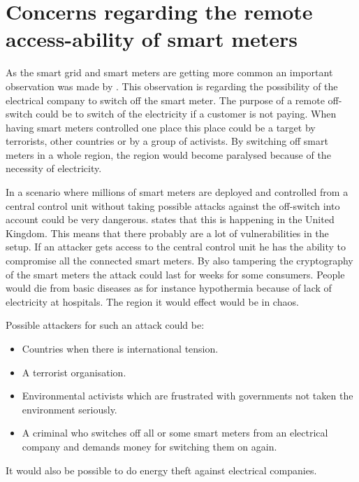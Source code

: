 \section{Concerns regarding the remote access-ability of smart meters}\label{off_switch}
As the smart grid and smart meters are getting more common an important observation was made by \citet{offswitch}.
This observation is regarding the possibility of the electrical company to switch off the smart meter.
The purpose of a remote off-switch could be to switch of the electricity if a customer is not paying.
When having smart meters controlled one place this place could be a target by terrorists, other countries or by a group of activists. 
By switching off smart meters in a whole region, the region would become paralysed because of the necessity of electricity.


In a scenario where millions of smart meters are deployed and controlled from a central control unit without taking possible attacks against the off-switch into account could be very dangerous.
\citet{offswitch} states that this is happening in the United Kingdom.
This means that there probably are a lot of vulnerabilities in the setup.
If an attacker gets access to the central control unit he has the ability to compromise all the connected smart meters.
By also tampering the cryptography of the smart meters the attack could last for weeks for some consumers.
People would die from basic diseases as for instance hypothermia because of lack of electricity at hospitals.
The region it would effect would be in chaos.

Possible attackers for such an attack could be:
\begin{itemize}
\item Countries when there is international tension.
\item A terrorist organisation.
\item Environmental activists which are frustrated with governments not taken the environment seriously.
\item A criminal who switches off all or some smart meters from an electrical company and demands money for switching them on again.
\end{itemize}

It would also be possible to do energy theft against electrical companies.
